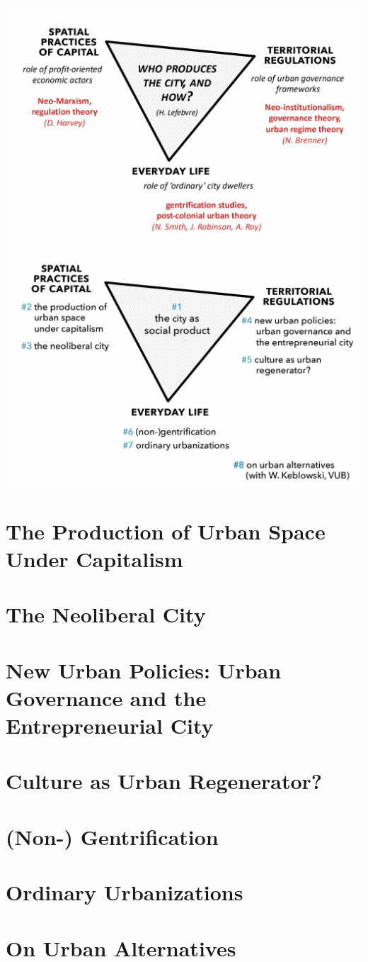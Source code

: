 \documentclass{article}
\begin{document}
\includegraphics[width=\textwidth]{map_course_organisation1}
\includegraphics[width=\textwidth]{map_course_organisation2}


\section{The Production of Urban Space Under Capitalism}

\section{The Neoliberal City}

\section{New Urban Policies: Urban Governance and the Entrepreneurial City}

\section{Culture as Urban Regenerator?}

\section{(Non-) Gentrification}

\section{Ordinary Urbanizations}

\section{On Urban Alternatives}
\end{document}
